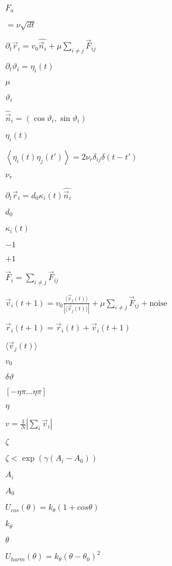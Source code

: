 \documentclass{article}
\begin{document}
$ F_a $
\pagebreak

$ = \nu \sqrt{dt} $
\pagebreak

$ \partial_t \vec r_i = v_0 \hat{\vec n_i} + \mu \sum_{i\neq j}\vec F_{ij} $
\pagebreak

$ \partial_t \vartheta_i = \eta_i(t) $
\pagebreak

$ \mu $
\pagebreak

$ \vartheta_i $
\pagebreak

$ \hat{\vec n}_i = \left(\cos\vartheta_i,\sin\vartheta_i\right) $
\pagebreak

$ \eta_i(t) $
\pagebreak

$ \left<\eta_i(t)\eta_j(t')\right> = 2\nu_r\delta_{ij}\delta\left(t-t'\right) $
\pagebreak

$ \nu_r $
\pagebreak

$ \partial_t \vec r_i = d_0 \kappa_i(t) \hat{\vec n_i} $
\pagebreak

$ d_0 $
\pagebreak

$ \kappa_i(t) $
\pagebreak

$ -1 $
\pagebreak

$ +1 $
\pagebreak

$ \vec F_i = \sum_{i\neq j}\vec F_{ij} $
\pagebreak

$ \vec v_i(t+1) = v_0\frac{\langle\vec v_j(t)\rangle}{\left|\langle\vec v_j(t)\rangle\right|} + \mu \sum_{i\neq j}\vec F_{ij} + \mathrm{noise} $
\pagebreak

$ \vec r_i(t+1) = \vec r_i(t) + \vec v_i(t+1) $
\pagebreak

$ \langle\vec v_j(t)\rangle $
\pagebreak

$ v_0 $
\pagebreak

$ \delta\vartheta $
\pagebreak

$ [-\eta\pi\dots\eta\pi] $
\pagebreak

$ \eta $
\pagebreak

$ v = \frac{1}{N}\left|\sum_i \vec v_i\right| $
\pagebreak

$ \zeta $
\pagebreak

$ \zeta < \exp\left(\gamma(A_i-A_0)\right) $
\pagebreak

$ A_i $
\pagebreak

$ A_0 $
\pagebreak

$ U_{cos}\left(\theta\right) = k_\theta\left(1+cos\theta\right) $
\pagebreak

$ k_\theta $
\pagebreak

$ \theta $
\pagebreak

$ U_{harm}\left(\theta\right) = k_\theta\left(\theta-\theta_0\right)^2 $
\pagebreak
\end{document}

